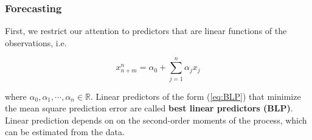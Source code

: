 \documentclass[%
xcolor=pdftex]{beamer}
\begin{document}
\begin{frame}
\frametitle{Forecasting}

First, we restrict our attention to predictors that are linear functions of the observations, i.e.

\begin{equation} \label{eq:BLP}
x_{n+m}^n = \alpha_0 + \sum_{j=1}^n \alpha_j x_j
\end{equation}

where $\alpha_0, \alpha_1, \cdots, \alpha_n \in \mathbb{R}$. Linear predictors of the form (\ref{eq:BLP}) that minimize the mean square prediction error are called \textbf{best linear predictors (BLP)}.\\

\vspace{5mm}
Linear prediction depends on on the second-order moments of the process, which can be estimated from the data.

\end{frame}

%
%
%
%
%
%
%
%
%
%
%
%
%
%
%
%
\end{document}
